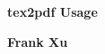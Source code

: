 \begin{titlepage}
  \begin{center}
  \thispagestyle{empty}

  \vspace*{0.5cm}

  \Huge
	  \textbf{tex2pdf Usage}

  \vspace{0.5cm}
  \vfill

  \Large
  \textbf{Frank Xu}

  \end{center}
  \clearpage

\end{titlepage}
